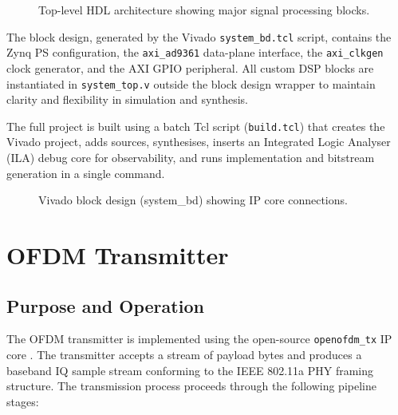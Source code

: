 \documentclass[12pt, a4paper, oneside]{report}
\begin{document}
\begin{figure}[H]
{%
  }
  \caption{Top-level HDL architecture showing major signal processing blocks.}
  \label{fig:hdl_arch}
\end{figure}

The block design, generated by the Vivado \texttt{system\_bd.tcl} script, contains the Zynq PS configuration, the \texttt{axi\_ad9361} data-plane interface, the \texttt{axi\_clkgen} clock generator, and the AXI GPIO peripheral. All custom DSP blocks are instantiated in \texttt{system\_top.v} outside the block design wrapper to maintain clarity and flexibility in simulation and synthesis.

The full project is built using a batch Tcl script (\texttt{build.tcl}) that creates the Vivado project, adds sources, synthesises, inserts an Integrated Logic Analyser (ILA) debug core for observability, and runs implementation and bitstream generation in a single command.

\begin{figure}[H]
  \centering
  \caption{Vivado block design (system\_bd) showing IP core connections.}
  \label{fig:vivado_bd}
\end{figure}

\section{OFDM Transmitter}

\subsection{Purpose and Operation}

The OFDM transmitter is implemented using the open-source \texttt{openofdm\_tx} IP core \cite{openofdm}. The transmitter accepts a stream of payload bytes and produces a baseband IQ sample stream conforming to the IEEE 802.11a PHY framing structure. The transmission process proceeds through the following pipeline stages:
\end{document}
